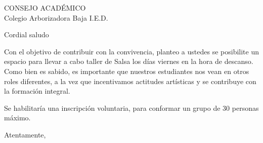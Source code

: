 \documentclass[letterpaper,spanish]{letter}
\begin{document}
\begin{letter}{CONSEJO ACADÉMICO\\Colegio Arborizadora Baja I.E.D.}
	
\opening{Cordial saludo}
Con el objetivo de contribuir con la convivencia, planteo a ustedes se posibilite un espacio para llevar a cabo taller de Salsa los días viernes en la hora de descanso. Como bien es sabido, es importante que nuestros estudiantes nos vean en otros roles diferentes, a la vez que incentivamos actitudes artísticas y se contribuye con la formación integral.

Se habilitaría una inscripción voluntaria, para conformar un grupo de 30 personas máximo.

\closing{Atentamente,}


\end{letter}
\end{document}
